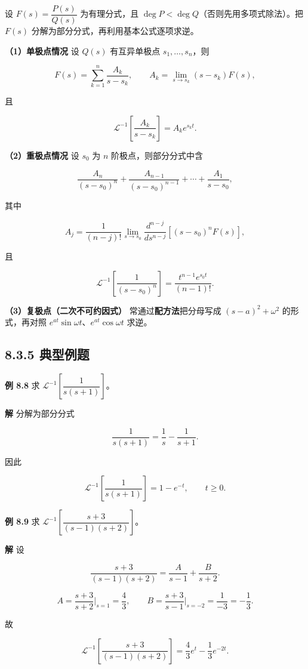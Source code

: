 设 \(F(s)=\dfrac{P(s)}{Q(s)}\) 为有理分式，且
\(\deg P<\deg Q\)（否则先用多项式除法）。把 \(F(s)\)
分解为部分分式，再利用基本公式逐项求逆。

\textbf{（1）单极点情况} 设 \(Q(s)\) 有互异单极点 \(s_1,\ldots,s_n\)，则

\[
F(s)=\sum_{k=1}^{n}\frac{A_k}{s-s_k},\qquad
A_k=\lim_{s\to s_k}(s-s_k)F(s),
\]

且

\[
\mathcal{L}^{-1}\left[\frac{A_k}{s-s_k}\right]=A_k e^{s_k t}.
\]

\textbf{（2）重极点情况} 设 \(s_0\) 为 \(n\) 阶极点，则部分分式中含

\[
\frac{A_n}{(s-s_0)^n}+\frac{A_{n-1}}{(s-s_0)^{n-1}}+\cdots+\frac{A_1}{s-s_0},
\]

其中

\[
A_j=\frac{1}{(n-j)!}\lim_{s\to s_0}\frac{d^{n-j}}{ds^{n-j}}\left[(s-s_0)^n F(s)\right],
\]

且

\[
\mathcal{L}^{-1}\left[\frac{1}{(s-s_0)^n}\right]=\frac{t^{n-1}e^{s_0 t}}{(n-1)!}.
\]

\textbf{（3）复极点（二次不可约因式）} 常通过\textbf{配方法}把分母写成
\((s-a)^2+\omega^2\) 的形式，再对照
\(e^{at}\sin\omega t\)、\(e^{at}\cos\omega t\) 求逆。

\subsection{8.3.5 典型例题}\label{ux5178ux578bux4f8bux9898-6}

\textbf{例 8.8} 求 \(\mathcal{L}^{-1}\left[\dfrac{1}{s(s+1)}\right]\)。

\textbf{解} 分解为部分分式

\[
\frac{1}{s(s+1)}=\frac{1}{s}-\frac{1}{s+1}.
\]

因此

\[
\mathcal{L}^{-1}\left[\frac{1}{s(s+1)}\right]=1-e^{-t},\qquad t\ge 0 .
\]

\textbf{例 8.9} 求
\(\mathcal{L}^{-1}\left[\dfrac{s+3}{(s-1)(s+2)}\right]\)。

\textbf{解} 设

\[
\frac{s+3}{(s-1)(s+2)}=\frac{A}{s-1}+\frac{B}{s+2}.
\]

\[
A=\frac{s+3}{s+2}\Bigr|_{s=1}=\frac{4}{3},\qquad
B=\frac{s+3}{s-1}\Bigr|_{s=-2}=\frac{1}{-3}=-\frac{1}{3}.
\]

故

\[
\mathcal{L}^{-1}\left[\frac{s+3}{(s-1)(s+2)}\right]
=\frac{4}{3}e^{t}-\frac{1}{3}e^{-2t}.
\]

